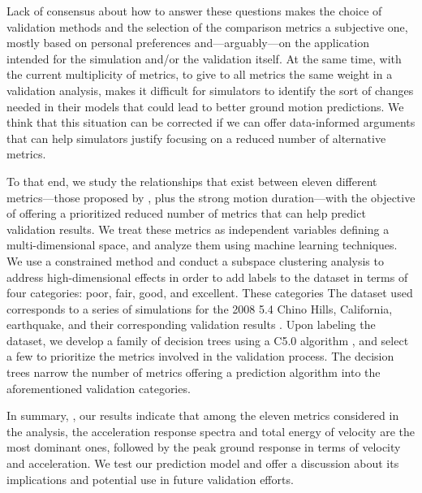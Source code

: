 Lack of consensus about how to answer these questions makes the choice of validation methods and the selection of the comparison metrics a subjective one, mostly based on personal preferences and---arguably---on the application intended for the simulation and/or the validation itself. At the same time, with the current multiplicity of metrics, to give to all metrics the same weight in a validation analysis, makes it difficult for simulators to identify the sort of changes needed in their models that could lead to better ground motion predictions. We think that this situation can be corrected if we can offer data-informed arguments that can help simulators justify focusing on a reduced number of alternative metrics.

To that end, we study the relationships that exist between eleven different metrics---those proposed by \citet{Anderson_2004_Proc}, plus the strong motion duration---with the objective of offering a prioritized reduced number of metrics that can help predict validation results. We treat these metrics as independent variables defining a multi-dimensional space, and analyze them using machine learning techniques. We use a constrained \kmeans{} method \citep[e.g.,][]{Macqueen_1967_Proc, Wagstaff_2001_Proc} and conduct a subspace clustering analysis to address high-dimensional effects in order to add labels to the dataset in terms of four categories: poor, fair, good, and excellent. These categories 
The dataset used corresponds to a series of simulations for the 2008  5.4 Chino Hills, California, earthquake, and their corresponding validation results \citep{Taborda_2014_BSSA}. Upon labeling the dataset, we develop a family of decision trees using a C5.0 algorithm \citep[][]{Quinlan_1993_Book, Quinlan_1996_JAIR}, and select a few to prioritize the metrics involved in the validation process. The decision trees narrow the number of metrics offering a prediction algorithm into the aforementioned validation categories. 

In summary, , our results indicate that 
among the eleven metrics considered in the analysis, the acceleration response spectra and total energy of velocity are the most dominant ones, followed by the peak ground response in terms of velocity and acceleration. We test our prediction model and offer a discussion about its implications and potential use in future validation efforts.
